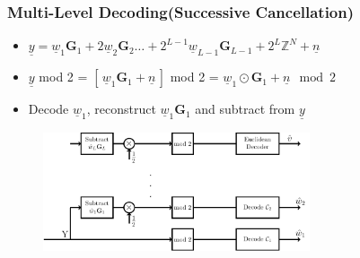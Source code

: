 \documentclass[10pt]{beamer}
\begin{document}
\begin{frame}\frametitle{Multi-Level Decoding(Successive Cancellation) }
      \begin{itemize}
        \item $\underline{y} = \boxed{\underline{w}_1 \mathbf{G}_1 + 2 \underline{w}_2 \mathbf{G}_2 \ldots +2^{L-1} \underline{w}_{L-1} \mathbf{G}_{L-1} +2^{L}\mathbb{Z}^{N}} + \underline{n}$
         \vspace{0.05in}	
         \item $\underline{y}$ mod 2 = $ \left[\,\underline{w}_1 \mathbf{G}_1 + \underline{n}\,\right] $ mod 2 = $\underline{w}_1 \odot \mathbf{G}            _1 + \boxed{\underline{n} \mod 2}$
         \vspace{0.05in}
		\item Decode $\underline{w}_1$, reconstruct $\underline{w}_1 \mathbf{G}_1$ and subtract from $\underline{y}$
         \vspace{0.2in}
    \end{itemize}
            \begin{figure}
					\includegraphics[width=0.7\textwidth]{multi_stage_decode.pdf}
            \end{figure}
	\end{frame}
\end{document}
